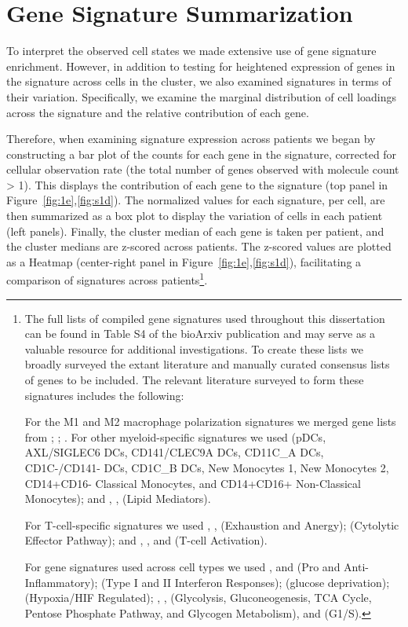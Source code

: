 \section{Gene Signature Summarization}

To interpret the observed cell states we made extensive use of gene signature enrichment.  
However, in addition to testing for heightened expression of genes in the signature across cells in the cluster, we also examined signatures in terms of their variation.
Specifically, we examine the marginal distribution of cell loadings across the signature and the relative contribution of each gene.

Therefore, when examining signature expression across patients we began by constructing a bar plot of the counts for each gene in the signature, corrected for cellular observation rate (the total number of genes observed with molecule count \textgreater{} 1).
This displays the contribution of each gene to the signature (top panel in Figure~\ref{fig:1e},\ref{fig:s1d}).
The normalized values for each signature, per cell, are then summarized as a box plot to display the variation of cells in each patient (left panels).
Finally, the cluster median of each gene is taken per patient, and the cluster medians are z-scored across patients.
The z-scored values are plotted as a Heatmap (center-right panel in Figure~\ref{fig:1e},\ref{fig:s1d}), facilitating a comparison of signatures across patients\footnote{The full lists of compiled gene signatures used throughout this dissertation can be found in Table S4 of the bioArxiv publication and may serve as a valuable resource for additional investigations. %
To create these lists we broadly surveyed the extant literature and manually curated consensus lists of genes to be included.
The relevant literature surveyed to form these signatures includes the following:

For the M1 and M2 macrophage polarization signatures we merged gene lists from \citep{Sica2012}; \citep{Biswas2010}; \citep{Bronte2016} \citep{Ugel2015} \citep{Gabrilovich2017}.
For other myeloid-specific signatures we used \citep{Villani2017} (pDCs, AXL/SIGLEC6 DCs, CD141/CLEC9A DCs, CD11C\_A DCs, CD1C-/CD141- DCs, CD1C\_B DCs, New Monocytes 1, New Monocytes 2, CD14+CD16- Classical Monocytes, and CD14+CD16+ Non-Classical Monocytes); and \citep{Gesta2007}, \citep{Perera2006}, \citep{Farmer2006,Lefterova2009} (Lipid Mediators).

For T-cell-specific signatures we used \citep{Wherry2015}, \citep{Wherry2011}, \citep{Schietinger2012} (Exhaustion and Anergy); \citep{Glimcher2004} (Cytolytic Effector Pathway); and \citep{Smith-Garvin2009}, \citep{Chtanova2005}, and \citep{AdamBest2013} (T-cell Activation).

For gene signatures used across cell types we used \citep{Mantovani2008}, and \citep{Grivennikov2010} (Pro and Anti-Inflammatory); \citep{Platanias2005} (Type I and II Interferon Responses); \citep{Ho2015} (glucose deprivation); \citep{Benita2009,Makino2003} (Hypoxia/HIF Regulated); \citep{Moreno-Sanchez2009}, \citep{Caton2010,Funes2007,Mues2009}, \citep{Beale2007} (Glycolysis, Gluconeogenesis, TCA Cycle, Pentose Phosphate Pathway, and Glycogen Metabolism), and \citep{Whitfield2002} (G1/S).}.


